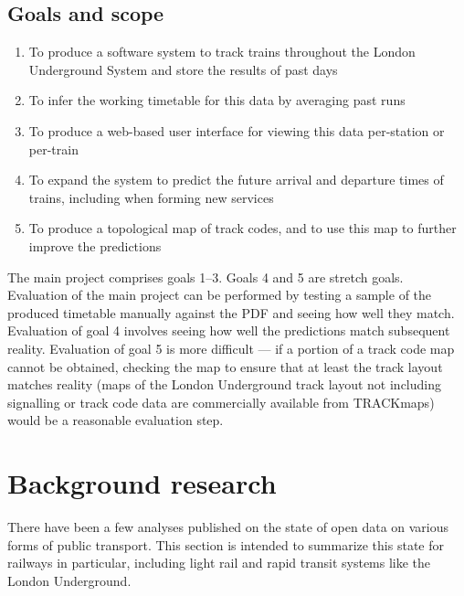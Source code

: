 \documentclass[a4paper,12pt]{article}
\begin{document}
\subsection{Goals and scope}

\begin{enumerate}
  \item To produce a software system to track trains throughout the London
    Underground System and store the results of past days
  \item To infer the working timetable for this data by averaging past runs
  \item To produce a web-based user interface for viewing this data per-station
    or per-train
  \item To expand the system to predict the future arrival and departure times
    of trains, including when forming new services
  \item To produce a topological map of track codes, and to use this map to
    further improve the predictions
\end{enumerate}

The main project comprises goals 1--3. Goals 4 and 5 are stretch goals.
Evaluation of the main project can be performed by testing a sample of the
produced timetable manually against the PDF and seeing how well they match.
Evaluation of goal 4 involves seeing how well the predictions match subsequent
reality. Evaluation of goal 5 is more difficult --- if a portion of a track
code map cannot be obtained, checking the map to ensure that at least the track
layout matches reality (maps of the London Underground track layout not
including signalling or track code data are commercially available from
TRACKmaps\cite{TRACKmaps5}) would be a reasonable evaluation step.

\section{Background research}

There have been a few analyses published on the state of open data on various
forms of public transport. This section is intended to summarize this state for
railways in particular, including light rail and rapid transit systems like the
London Underground.
\end{document}
